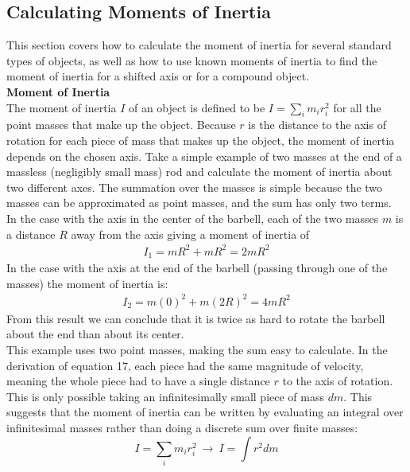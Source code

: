 \documentclass[a4paper]{article}
\let\bf\textbf
\begin{document}
\subsection{Calculating Moments of Inertia}
This section covers how to calculate the moment of inertia for several standard types of objects, as well as how to use known moments of inertia to find the moment of inertia for a shifted axis or for a compound object.
\vspace{2mm}\\
\bf{Moment of Inertia}
\vspace{1mm}\\
The moment of inertia $I$ of an object is defined to be $I = \sum\limits_{i}m_ir^2_i$ for all the point masses that make up the object. Because $r$ is the distance to the axis of rotation for each piece of mass that makes up the object, the moment of inertia depends on the chosen axis. Take a simple example of two masses at the end of a massless (negligibly small mass) rod and calculate the moment of inertia about two different axes. The summation over the masses is simple because the two masses can be approximated as point masses, and the sum has only two terms.\vspace{1mm}\\
In the case with the axis in the center of the barbell, each of the two masses $m$ is a distance $R$ away from the axis giving a moment of inertia of
\begin{align*}
    I_1 = mR^2 + mR^2 = 2mR^2
\end{align*}
In the case with the axis at the end of the barbell (passing through one of the masses) the moment of inertia is:
\begin{align*}
    I_2 = m(0)^2 + m(2R)^2 = 4mR^2
\end{align*}
From this result we can conclude that it is twice as hard to rotate the barbell about the end than about its center.\vspace{1mm}\\
This example uses two point masses, making the sum easy to calculate. In the derivation of equation 17, each piece had the same magnitude of velocity, meaning the whole piece had to have a single distance $r$ to the axis of rotation. This is only possible taking an infinitesimally small piece of mass $dm$. This suggests that the moment of inertia can be written by evaluating an integral over infinitesimal masses rather than doing a discrete sum over finite masses:
\begin{equation}
    I = \sum_{i}m_ir_i^2\ \boldsymbol{\to}\ I = \int r^2dm
\end{equation}
\end{document}
